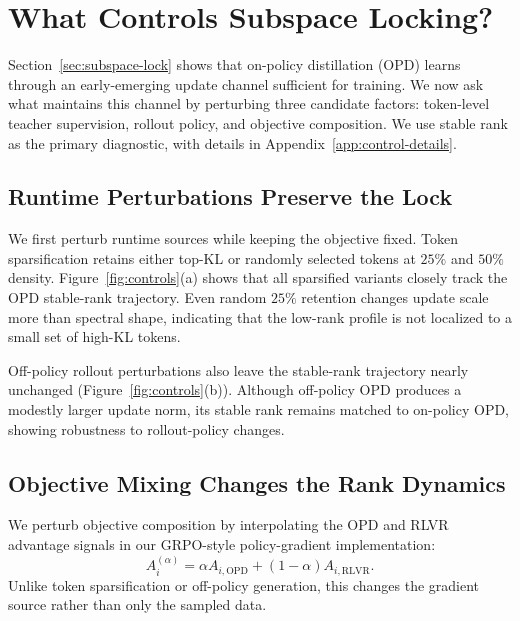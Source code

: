 
\section{What Controls Subspace Locking?}
\label{sec:controls}
Section~\ref{sec:subspace-lock} shows that on-policy distillation (OPD) learns through an
early-emerging update channel sufficient for training. We now ask what
maintains this channel by perturbing three candidate factors: token-level
teacher supervision, rollout policy, and objective composition. We use stable rank as the primary diagnostic, with details in Appendix~\ref{app:control-details}.



\subsection{Runtime Perturbations Preserve the Lock}
\label{sec:runtime-controls}

We first perturb runtime sources while keeping the objective fixed. Token
sparsification retains either top-KL or randomly selected tokens at
$25\%$ and $50\%$ density. Figure~\ref{fig:controls}(a) shows that all
sparsified variants closely track the OPD stable-rank trajectory. Even
random $25\%$ retention changes update scale more than spectral shape,
indicating that the low-rank profile is not localized to a small set of
high-KL tokens.


Off-policy rollout perturbations also leave the stable-rank trajectory
nearly unchanged (Figure~\ref{fig:controls}(b)). Although off-policy OPD
produces a modestly larger update norm, its stable rank remains matched to
on-policy OPD, showing robustness to rollout-policy changes.

\subsection{Objective Mixing Changes the Rank Dynamics}
\label{sec:objective-mixing}
We perturb objective composition by interpolating the OPD and RLVR
advantage signals in our GRPO-style policy-gradient implementation:
\begin{equation}
    A_i^{(\alpha)}
    =
    \alpha A_{i,\mathrm{OPD}}
    +
    (1-\alpha)A_{i,\mathrm{RLVR}} .
    \label{eq:objective-mixing}
\end{equation}
Unlike token sparsification or off-policy generation, this changes the
gradient source rather than only the sampled data.

